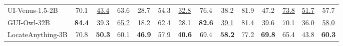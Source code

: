 \begin{table}[t]
{\begin{tabular}{l|ccccccccccccc}
      UI-Venus-1.5-2B~\citep{team_ui-venus-15_2026}
        & 70.1 & \underline{43.4} & 63.6 & 28.7 & 54.3 & \underline{32.8} & 76.4 & 38.2 & 81.9 & 47.2 & \underline{73.8} & \underline{51.7} & 57.7 \\
      GUI-Owl-32B~\citep{ye_mobile-agent-v3_2025}
        & \textbf{84.4} & 39.3 & \underline{65.2} & 18.2 & 62.4 & 28.1 & \textbf{82.6} & \underline{39.1} & 81.4 & 39.6 & 70.1 & 36.0 & \underline{58.0} \\
\rowcolor{lightblue!10}
      LocateAnything-3B
        & 70.8 & \textbf{50.3} & 60.1 & \textbf{46.9}
        & 57.9 & \textbf{40.6} & 69.4 & \textbf{58.2}
        & 77.2 & \textbf{69.8} & 65.4 & 43.8
        & \textbf{60.3}
      \\

      \bottomrule
    \end{tabular}%
  }
  \label{tab:gui_grounidng}
\end{table}
